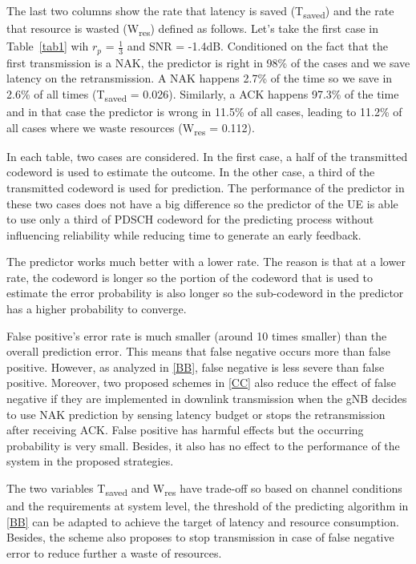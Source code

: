 \documentclass[conference]{IEEEtran}
\begin{document}
The last two columns show the rate that latency is saved (T\textsubscript{saved}) and the rate that resource is wasted (W\textsubscript{res}) defined as follows. Let's take the first case in Table~\ref{tab1} wih $r_{p}$ = $\frac{1}{3}$ and SNR = -1.4dB. Conditioned on the fact that the first transmission is a NAK, the predictor is right in 98\% of the cases and we save latency on the retransmission. A NAK happens 2.7\% of the time so we save in 2.6\% of all times (T\textsubscript{saved} = 0.026). Similarly, a ACK happens 97.3\% of the time and in that case the predictor is wrong in 11.5\% of all cases, leading to 11.2\% of all cases where we waste resources (W\textsubscript{res} = 0.112).

In each table, two cases are considered. In the first case, a half of the transmitted codeword is used to estimate the outcome. In the other case, a third of the transmitted codeword is used for prediction. The performance of the predictor in these two cases does not have a big difference so the predictor of the UE is able to use only a third of PDSCH codeword for the predicting process without influencing reliability while reducing time to generate an early feedback.

The predictor works much better with a lower rate. The reason is that at a lower rate, the codeword is longer so the portion of the codeword that is used to estimate the error probability is also longer so the sub-codeword in the predictor has a higher probability to converge.

False positive's error rate is much smaller (around 10 times smaller) than the overall prediction error. This means that false negative occurs more than false positive. However, as analyzed in \ref{BB}, false negative is less severe than false positive. Moreover, two proposed schemes in \ref{CC} also reduce the effect of false negative if they are implemented in downlink transmission when the gNB decides to use NAK prediction by sensing latency budget or stops the retransmission after receiving ACK. False positive has harmful effects but the occurring probability is very small. Besides, it also has no effect to the performance of the system in the proposed strategies. 

The two variables T\textsubscript{saved} and W\textsubscript{res} have trade-off so based on channel conditions and the requirements at system level, the threshold of the predicting algorithm in \ref{BB} can be adapted to achieve the target of latency and resource consumption. Besides, the scheme also proposes to stop transmission in case of false negative error to reduce further a waste of resources.
\end{document}
